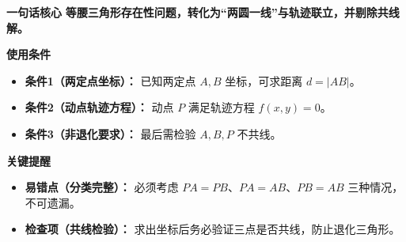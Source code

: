 \begin{summarybox}
	\textbf{\textcolor{CSummary}{一句话核心}}
	\textbf{等腰三角形存在性问题，转化为“两圆一线”与轨迹联立，并剔除共线解。}

	\medskip
	\textbf{\textcolor{CSummary}{使用条件}}
	\begin{itemize}[leftmargin=*, itemsep=0.5em, topsep=0.4em]
		\item \textbf{条件1（两定点坐标）：} 已知两定点 $A,B$ 坐标，可求距离 $d=|AB|$。
		\item \textbf{条件2（动点轨迹方程）：} 动点 $P$ 满足轨迹方程 $f(x,y)=0$。
		\item \textbf{条件3（非退化要求）：} 最后需检验 $A,B,P$ 不共线。
	\end{itemize}

	\medskip
	\textbf{\textcolor{CSummary}{关键提醒}}
	\begin{itemize}[leftmargin=*, itemsep=0.5em, topsep=0.4em]
		\item \textbf{易错点（分类完整）：} 必须考虑 $PA=PB$、$PA=AB$、$PB=AB$ 三种情况，不可遗漏。
		\item \textbf{检查项（共线检验）：} 求出坐标后务必验证三点是否共线，防止退化三角形。
	\end{itemize}

\end{summarybox}
